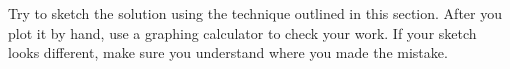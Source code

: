 \documentclass[10pt,letterpaper]{article}
\begin{document}
Try to sketch the solution using the technique outlined in this section. 
After you plot it by hand, use a graphing calculator to check your work. If your sketch looks different, make sure you understand where you made the mistake.




\end{document}
